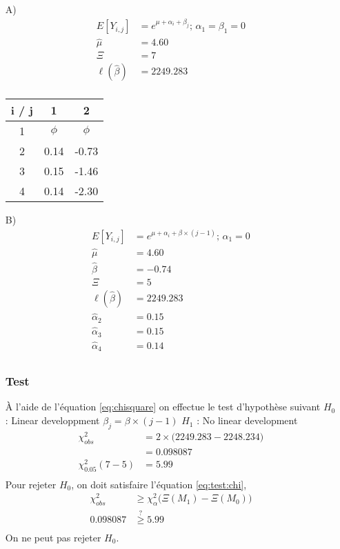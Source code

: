 \begin{itemize}
\item[A)] 
\begin{align*}
E[Y_{i,j}] &= e^{\mu + \alpha_i + \beta_j} \text{; } \alpha_1 = \beta_1 = 0 \\
\widehat{\mu} &= 4.60 \\
\Xi &= 7 \\
\ell(\widehat{\beta}) & = 2249.283 \\
\end{align*} 
\begin{center}
\begin{tabular}{|c|c|c|}
  \hline
   i / j & 1 & 2\\ 
  \hline
  1 & $\phi$ & $\phi$  \\
  2 & 0.14 & -0.73    \\
  3 & 0.15 & -1.46    \\
  4 & 0.14 &  -2.30  \\
  \hline
\end{tabular}
\end{center}
\bigskip

\item[B)] 
\begin{align*}
E[Y_{i,j}] &= e^{\mu + \alpha_i + \beta \times (j-1)} \text{; } \alpha_1 = 0 \\
\widehat{\mu} &= 4.60 \\
\widehat{\beta} &= -0.74 \\
\Xi &= 5 \\
\ell(\widehat{\beta}) & = 2249.283 \\
\widehat{\alpha}_2 &= 0.15 \\
\widehat{\alpha}_3 &= 0.15 \\
\widehat{\alpha}_4 &= 0.14 \\
\end{align*} 
\subsubsection*{Test}
À l'aide de l'équation \ref{eq:chisquare} on effectue le test d'hypothèse suivant \newline
$H_0$ : Linear developpment $\beta_j = \beta \times (j-1)$ \newline
$H_1$ :  No linear development
\begin{align*}
\chi_{obs}^2 &= 2 \times \Big( 2249.283 - 2248.234 \Big) \\
&= 0.098087 \\
\chi_{0.05}^2(7 - 5) &= 5.99 \\
\end{align*}
Pour rejeter $H_0$, on doit satisfaire l'équation \ref{eq:test:chi},
\begin{align*}
\chi_{obs}^2 &\geq \chi_{\alpha}^2\Big( \Xi (M_1) - \Xi (M_0) \Big) \\
0.098087 &\overset{?}{\geq} 5.99 \\
\end{align*}
On ne peut pas rejeter $H_0$.
\bigskip


\end{itemize}
